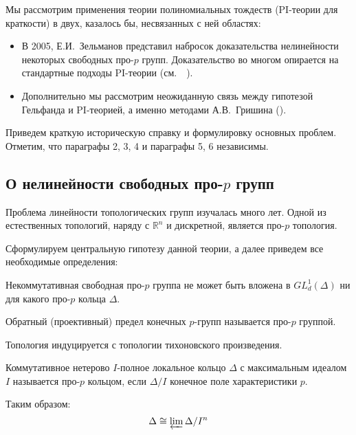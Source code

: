 Мы рассмотрим применения теории полиномиальных тождеств (PI-теории для краткости) в двух, казалось бы, несвязанных с ней областях:
\begin{itemize}
    \item В 2005, Е.И.\ Зельманов представил набросок доказательства нелинейности некоторых свободных про-$p$ групп.
    Доказательство во многом опирается на стандартные подходы PI-теории (см.\ ~\cite{Zelmanov1}).
    \item Дополнительно мы рассмотрим неожиданную связь между гипотезой Гельфанда и PI-теорией, а именно методами А.В.\ Гришина (\cite{Grishin}).
\end{itemize}

Приведем краткую историческую справку и формулировку основных проблем.
Отметим, что параграфы 2, 3, 4 и параграфы 5, 6 независимы.

\subsection{О нелинейности свободных про-$p$ групп}\label{subsec:introduction-pro-p}
Проблема линейности топологических групп изучалась много лет.
Одной из естественных топологий, наряду с $\mathbb{R}^n$ и дискретной, является про-$p$ топология.

Сформулируем центральную гипотезу данной теории, а далее приведем все необходимые определения:

\vskip 0.1in\noindent
\begin{conjecture}
    Некоммутативная свободная про-$p$ группа не может быть вложена в $GL^1_d(\Delta)$ ни для какого про-$p$ кольца $\Delta$.
\end{conjecture}
\vskip 0.1in\noindent

\vskip 0.1in\noindent
\begin{definition}
    Обратный (проективный) предел конечных $p$-групп называется про-$p$ группой.
\end{definition}
\vskip 0.1in\noindent
Топология индуцируется с топологии тихоновского произведения.

\vskip 0.1in\noindent
\begin{definition}
    Коммутативное нетерово $I$-полное локальное кольцо $\Delta$ с максимальным идеалом $I$ называется про-$p$ кольцом, если $\Delta/I$ конечное поле характеристики $p$.
\end{definition}
\vskip 0.1in\noindent

Таким образом:
\[
    \Delta \cong \varprojlim \Delta/I^n
\]

